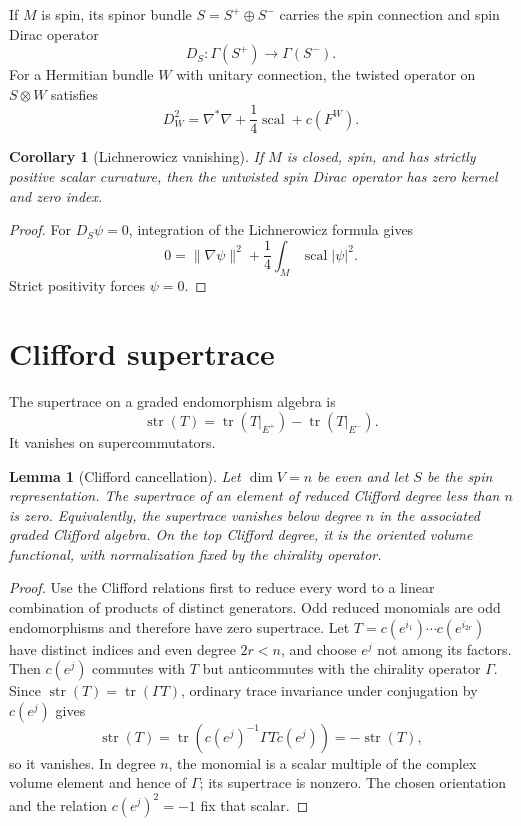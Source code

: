 \documentclass[11pt,oneside,reqno]{book}
\theoremstyle{plain}
\newtheorem{lemma}[theorem]{Lemma}
\newtheorem{corollary}[theorem]{Corollary}
\theoremstyle{definition}
\theoremstyle{remark}
\begin{document}
If \(M\) is spin, its spinor bundle \(S=S^+\oplus S^-\) carries the spin
connection and spin Dirac operator
\[
 D_S:\Gamma(S^+)\longrightarrow\Gamma(S^-).
\]
For a Hermitian bundle \(W\) with unitary connection, the twisted operator
on \(S\otimes W\) satisfies
\[
 D_W^2
 =
 \nabla^*\nabla+\frac14\operatorname{scal}+c(F^W).
\]

\begin{corollary}[Lichnerowicz vanishing]
If \(M\) is closed, spin, and has strictly positive scalar curvature, then
the untwisted spin Dirac operator has zero kernel and zero index.
\end{corollary}

\begin{proof}
For \(D_S\psi=0\), integration of the Lichnerowicz formula gives
\[
 0
 =
 \lVert\nabla\psi\rVert^2
 +\frac14\int_M\operatorname{scal}|\psi|^2.
\]
Strict positivity forces \(\psi=0\).
\end{proof}

\section{Clifford supertrace}

The supertrace on a graded endomorphism algebra is
\[
 \operatorname{str}(T)=\operatorname{tr}(T|_{E^+})
 -\operatorname{tr}(T|_{E^-}).
\]
It vanishes on supercommutators.

\begin{lemma}[Clifford cancellation]\label{lem:clifford-cancellation}
Let \(\dim V=n\) be even and let \(S\) be the spin representation. The
supertrace of an element of reduced Clifford degree less than \(n\) is
zero. Equivalently, the supertrace vanishes below degree \(n\) in the
associated graded Clifford algebra. On the top Clifford degree, it is the
oriented volume functional, with normalization fixed by the chirality
operator.
\end{lemma}

\begin{proof}
Use the Clifford relations first to reduce every word to a linear
combination of products of distinct generators. Odd reduced monomials are
odd endomorphisms and therefore have zero supertrace. Let
\(T=c(e^{i_1})\cdots c(e^{i_{2r}})\) have distinct indices and even degree
\(2r<n\), and choose \(e^j\) not among its factors. Then \(c(e^j)\)
commutes with \(T\) but anticommutes with the chirality operator
\(\Gamma\). Since \(\operatorname{str}(T)=\operatorname{tr}(\Gamma T)\),
ordinary trace invariance under conjugation by \(c(e^j)\) gives
\[
 \operatorname{str}(T)
 =\operatorname{tr}\!\left(c(e^j)^{-1}\Gamma T c(e^j)\right)
 =-\operatorname{str}(T),
\]
so it vanishes. In degree \(n\), the monomial is a scalar multiple of the
complex volume element and hence of \(\Gamma\); its supertrace is nonzero.
The chosen orientation and the relation \(c(e^j)^2=-1\) fix that scalar.
\end{proof}
\end{document}
